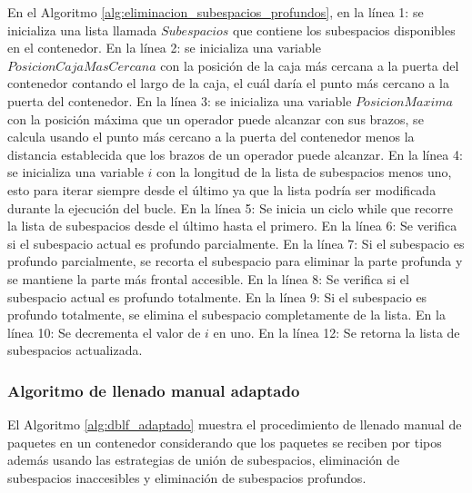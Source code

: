 En el Algoritmo \ref{alg:eliminacion_subespacios_profundos}, en la línea 1: se inicializa una lista llamada $Subespacios$ que contiene los subespacios disponibles en el contenedor. En la línea 2: se inicializa una variable $PosicionCajaMasCercana$ con la posición de la caja más cercana a la puerta del contenedor contando el largo de la caja, el cuál daría el punto más cercano a la puerta del contenedor. En la línea 3: se inicializa una variable $PosicionMaxima$ con la posición máxima que un operador puede alcanzar con sus brazos, se calcula usando el punto más cercano a la puerta del contenedor menos la distancia establecida que los brazos de un operador puede alcanzar. En la línea 4: se inicializa una variable $i$ con la longitud de la lista de subespacios menos uno, esto para iterar siempre desde el último ya que la lista podría ser modificada durante la ejecución del bucle. En la línea 5: Se inicia un ciclo while que recorre la lista de subespacios desde el último hasta el primero. En la línea 6: Se verifica si el subespacio actual es profundo parcialmente. En la línea 7: Si el subespacio es profundo parcialmente, se recorta el subespacio para eliminar la parte profunda y se mantiene la parte más frontal accesible. En la línea 8: Se verifica si el subespacio actual es profundo totalmente. En la línea 9: Si el subespacio es profundo totalmente, se elimina el subespacio completamente de la lista. En la línea 10: Se decrementa el valor de $i$ en uno. En la línea 12: Se retorna la lista de subespacios actualizada.

\subsubsection{Algoritmo de llenado manual adaptado}

El Algoritmo \ref{alg:dblf_adaptado} muestra el procedimiento de llenado manual de paquetes en un contenedor considerando que los paquetes se reciben por tipos además usando las estrategias de unión de subespacios, eliminación de subespacios inaccesibles y eliminación de subespacios profundos.

